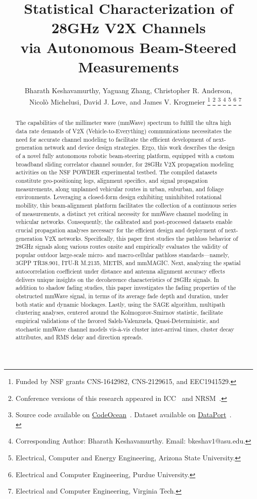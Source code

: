 \documentclass[10pt, twocolumn]{IEEEtran}
\title{Statistical Characterization of 28GHz V2X Channels\\ via Autonomous Beam-Steered Measurements}
\author{Bharath Keshavamurthy\IEEEauthorrefmark{1}, Yaguang Zhang\IEEEauthorrefmark{2}, Christopher R. Anderson\IEEEauthorrefmark{3},\\\ \ \ \ Nicol\`{o} Michelusi\IEEEauthorrefmark{1}, David J. Love\IEEEauthorrefmark{2}, and James V. Krogmeier\IEEEauthorrefmark{2}
\thanks{Funded by NSF grants CNS-1642982, CNS-2129615, and EEC1941529.}
\thanks{Conference versions of this research appeared in ICC~\cite{SPAVE_ICC} and NRSM~\cite{SPAVE_NRSM}.}
\thanks{Source code available on \href{https://codeocean.com/capsule/9545863/tree}{CodeOcean}~\cite{CodeOcean}. Dataset available on \href{http://ieee-dataport.org/12580}{DataPort}~\cite{DataPort}.\\}
\thanks{Corresponding Author: Bharath Keshavamurthy. Email: bkeshav$1$@asu.edu.}
\thanks{\IEEEauthorrefmark{1}Electrical, Computer and Energy Engineering, Arizona State University.}
\thanks{\IEEEauthorrefmark{2}Electrical and Computer Engineering, Purdue University.}
\thanks{\IEEEauthorrefmark{3}Electrical and Computer Engineering, Virginia Tech.}
\vspace{-10mm}
}
\begin{document}

\maketitle

\vspace{-10mm}

\begin{abstract}
The capabilities of the millimeter wave (mmWave) spectrum to fulfill the ultra high data rate demands of V2X (Vehicle-to-Everything) communications necessitates the need for accurate channel modeling to facilitate the efficient development of next-generation network and device design strategies. Ergo, this work describes the design of a novel fully autonomous robotic beam-steering platform, equipped with a custom broadband sliding correlator channel sounder, for 28GHz V2X propagation modeling activities on the NSF POWDER experimental testbed. The compiled datasets constitute geo-positioning logs, alignment specifics, and signal propagation measurements, along unplanned vehicular routes in urban, suburban, and foliage environments. Leveraging a closed-form design exhibiting uninhibited rotational mobility, this beam-alignment platform facilitates the collection of a continuous series of measurements, a distinct yet critical necessity for mmWave channel modeling in vehicular networks. Consequently, the calibrated and post-processed datasets enable crucial propagation analyses necessary for the efficient design and deployment of next-generation V2X networks. Specifically, this paper first studies the pathloss behavior of 28GHz signals along various routes onsite and empirically evaluates the validity of popular outdoor large-scale micro- and macro-cellular pathloss standards---namely, 3GPP TR38.901, ITU-R M.2135, METIS, and mmMAGIC. Next, analyzing the spatial autocorrelation coefficient under distance and antenna alignment accuracy effects delivers unique insights on the decoherence characteristics of 28GHz signals. In addition to shadow fading studies, this paper investigates the fading properties of the obstructed mmWave signal, in terms of its average fade depth and duration, under both static and dynamic blockages. Lastly, using the SAGE algorithm, multipath clustering analyses, centered around the Kolmogorov-Smirnov statistic, facilitate empirical validations of the favored Saleh-Valenzuela, Quasi-Deterministic, and stochastic mmWave channel models vis-\`{a}-vis cluster inter-arrival times, cluster decay attributes, and RMS delay and direction spreads.
\end{abstract}
\vspace{-1mm}
\end{document}
